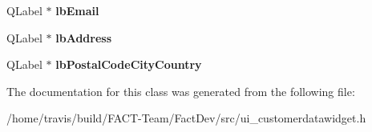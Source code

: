\begin{DoxyCompactItemize}
\item 
\hypertarget{classUi__CustomerDataWidget_a364fcb031b3594c4d034aaf5751318d2}{Q\-Label $\ast$ {\bfseries lb\-Email}}\label{classUi__CustomerDataWidget_a364fcb031b3594c4d034aaf5751318d2}

\item 
\hypertarget{classUi__CustomerDataWidget_a8a52fa86568c9743f3be6296ec5db999}{Q\-Label $\ast$ {\bfseries lb\-Address}}\label{classUi__CustomerDataWidget_a8a52fa86568c9743f3be6296ec5db999}

\item 
\hypertarget{classUi__CustomerDataWidget_a51a647b1e2142dd48bc490972e8c4893}{Q\-Label $\ast$ {\bfseries lb\-Postal\-Code\-City\-Country}}\label{classUi__CustomerDataWidget_a51a647b1e2142dd48bc490972e8c4893}

\end{DoxyCompactItemize}


The documentation for this class was generated from the following file\-:\begin{DoxyCompactItemize}
\item 
/home/travis/build/\-F\-A\-C\-T-\/\-Team/\-Fact\-Dev/src/ui\-\_\-customerdatawidget.\-h\end{DoxyCompactItemize}

